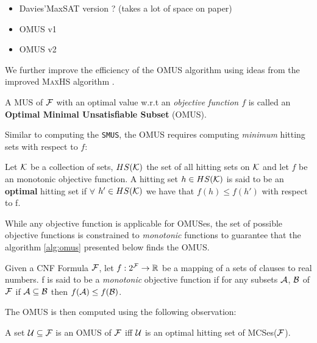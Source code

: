 

\begin{itemize}
  \item Davies'MaxSAT version ? (takes a lot of space on paper)
  \item OMUS v1
  \item OMUS v2
\end{itemize}
We further improve the efficiency of the OMUS algorithm using ideas from the improved \textsc{MaxHS} algorithm \cite{davies2013postponing}.

\begin{definition}
  A MUS of $\mathcal{F}$ with an optimal value w.r.t an \emph{objective function $f$} is called an \textbf{Optimal Minimal Unsatisfiable Subset} (OMUS).
\end{definition}

Similar to computing the \texttt{SMUS}, the OMUS requires computing \textit{minimum} hitting sets with respect to $f$:

\begin{definition}
  Let $\mathcal{K}$ be a collection of sets, $HS(\mathcal{K})$ the set of all hitting sets on $\mathcal{K}$ and let $f$ be an monotonic objective function.
  A hitting set $ h \in HS(\mathcal{K})$ is said to be an \textbf{optimal} hitting set if $\forall$ $h' \in HS(\mathcal{K})$ we have that $f(h) \leq f(h')$ with respect to f. %
\end{definition}

While any objective function is applicable for OMUSes, the set of possible objective functions is constrained to \emph{monotonic} functions to guarantee that the algorithm \ref{alg:omus} presented below finds the OMUS.

\begin{definition}
  Given a CNF Formula $\mathcal{F}$, let $f : 2^{\mathcal{F}} \rightarrow \mathbb{R}$ be a mapping of a sets of clauses to real numbers. f is said to be a \emph{monotonic} objective function if for any subsets $\mathcal{A}$, $\mathcal{B}$ of $\mathcal{F}$ if $\mathcal{A} \subseteq \mathcal{B}$ then $f(\mathcal{A}) \leq f(\mathcal{B})$.
\end{definition}

The OMUS is then computed using the following observation:

\begin{proposition}\label{prop:optimal-hitting-set}
  A set $\mathcal{U} \subseteq \mathcal{F}$ is an OMUS of $\mathcal{F}$ iff $\mathcal{U}$ is an optimal hitting set of MCSes($\mathcal{F}$).
\end{proposition}

